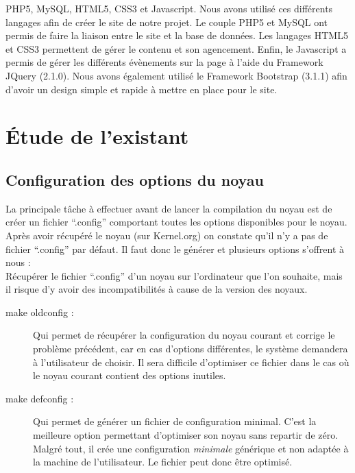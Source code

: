 \documentclass[17pts]{report}
\begin{document}
PHP5, MySQL, HTML5, CSS3 et Javascript. Nous avons utilisé ces différents
langages afin de créer le site de notre projet. Le couple PHP5 et MySQL ont
permis de faire la liaison entre le site et la base de données. Les langages
HTML5 et CSS3 permettent de gérer le contenu et son agencement.  Enfin, le
Javascript a permis de gérer les différents évènements sur la page à l'aide du
Framework JQuery (2.1.0). Nous avons également utilisé le Framework Bootstrap
(3.1.1) afin d'avoir un design simple et rapide à mettre en place pour le site.
\\

\chapter{Étude de l'existant}
\label{cha:Étude de l'existant}
\section{Configuration des options du noyau}
\label{sec:Configuration des options du noyau}
La principale tâche à effectuer avant de lancer la compilation du noyau est de
créer un fichier “.config” comportant toutes les options disponibles pour le
noyau.  Après avoir récupéré le noyau (sur Kernel.org) on constate qu’il n’y a
pas de fichier “.config” par défaut. Il faut donc le générer et plusieurs
options s’offrent à nous :
\\

Récupérer le fichier “.config” d’un noyau sur l’ordinateur que l’on souhaite,
mais il risque d’y avoir des incompatibilités à cause de la version des noyaux.
\begin{description}
    \item[make oldconfig :] Qui permet de récupérer la configuration du noyau
        courant et corrige le problème précédent, car en cas d’options
        différentes, le système demandera à l’utilisateur de choisir. Il sera
        difficile d’optimiser ce fichier dans le cas où le noyau courant
        contient des options inutiles.
    \item[make defconfig :] Qui permet de générer un fichier de configuration
        minimal. C’est la meilleure option permettant d’optimiser son noyau
        sans repartir de zéro. Malgré tout, il crée une configuration
        \textit{minimale} générique et non adaptée à la machine de
        l’utilisateur.  Le fichier peut donc être optimisé.
\end{description}
\end{document}
